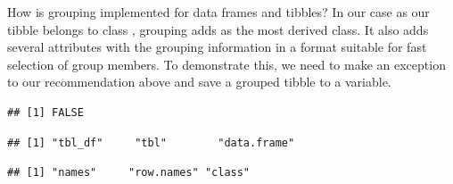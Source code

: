 \documentclass[krantz2]{krantz}\usepackage{knitr}
\begin{document}
\begin{warningbox}
How is grouping implemented for data frames and tibbles? In our case as our tibble belongs to class , grouping adds  as the most derived class. It also adds several attributes with the grouping information in a format suitable for fast selection of group members. To demonstrate this, we need to make an exception to our recommendation above and save a grouped tibble to a variable.

\begin{knitrout}\footnotesize
{}\color{fgcolor}\begin{kframe}
\begin{alltt}
 \hlkwb{<-} \hlstd{(} \hlstd{=} \hlopt{:}\hlstd{,}  \hlstd{=} \hlstd{(letters[}\hlopt{:}\hlstd{],} \hlstd{))}
\end{alltt}
\begin{verbatim}
## [1] FALSE
\end{verbatim}
\begin{alltt}
\end{alltt}
\begin{verbatim}
## [1] "tbl_df"     "tbl"        "data.frame"
\end{verbatim}
\begin{alltt}
\hlstd{(}
\end{alltt}
\begin{verbatim}
## [1] "names"     "row.names" "class"
\end{verbatim}
\end{kframe}
\end{knitrout}


\end{warningbox}
\end{document}
